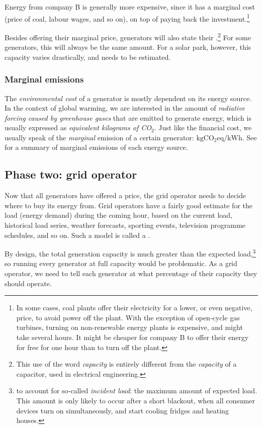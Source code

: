 \documentclass[main.tex]{subfiles}
\begin{document}
Energy from company B is generally more expensive, since it has a marginal cost (price of coal, labour wages, and so on), on top of paying back the investment.\footnote{In some cases, coal plants offer their electricity for a lower, or even negative, price, to avoid power off the plant. With the exception of open-cycle gas turbines, turning on non-renewable energy plants is expensive, and might take several hours. It might be cheaper for company B to offer their energy for free for one hour than to turn off the plant.}

Besides offering their marginal price, generators will also state their .\footnote{This use of the word \emph{capacity} is entirely different from the \emph{capacity} of a capacitor, used in electrical engineering.} For some generators, this will always be the same amount. For a solar park, however, this capacity varies drastically, and needs to be estimated.

\subsubsection*{Marginal emissions}
The \emph{environmental cost} of a generator is mostly dependent on its energy source. In the context of global warming, we are interested in the amount of \emph{radiative forcing caused by greenhouse gases} that are emitted to generate energy, which is usually expressed as \emph{equivalent kilograms of CO$_2$}. Just like the financial cost, we usually speak of the \emph{marginal} emission of a certain generator: $\si{\kilo\gram}\text{CO}_2\text{eq} / \si{\kilo\watt\hour}$. See \cite{IPCCWG3AR5} for a summary of marginal emissions of each energy source.

\subsection*{Phase two: grid operator}
Now that all generators have offered a price, the grid operator needs to decide where to buy its energy from. Grid operators have a fairly good estimate for the load (energy demand) during the coming hour, based on the current load, historical load series, weather forecasts, sporting events, television programme schedules, and so on. Such a model is called a .

By design, the total generation capacity is much greater than the expected load,\footnote{to account for so-called \emph{incident load}: the maximum amount of expected load. This amount is only likely to occur after a short blackout, when all consumer devices turn on simultaneously, and start cooling fridges and heating houses.} so running every generator at full capacity would be problematic.
As a grid operator, we need to tell each generator at what percentage of their capacity they should operate.
\end{document}
